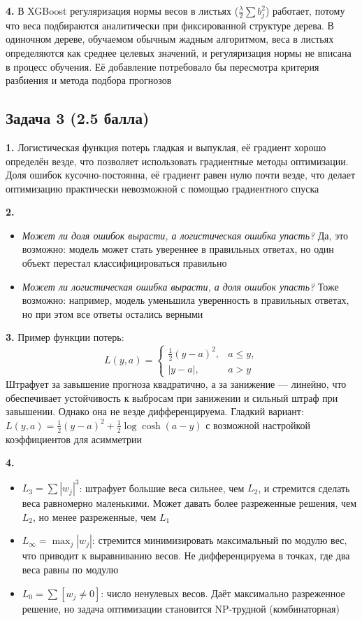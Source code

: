 \documentclass[a4paper,12pt]{article}
\begin{document}
\bigskip

\textbf{4.} В XGBoost регуляризация нормы весов в листьях (\(\frac{\lambda}{2}\sum b_j^2\)) работает, потому что веса подбираются аналитически при фиксированной структуре дерева.
В одиночном дереве, обучаемом обычным жадным алгоритмом, веса в листьях определяются как среднее целевых значений, и регуляризация нормы не вписана в процесс обучения.
Её добавление потребовало бы пересмотра критерия разбиения и метода подбора прогнозов

\newpage

\subsection*{Задача 3 (2.5 балла)}

\textbf{1.} Логистическая функция потерь гладкая и выпуклая, её градиент хорошо определён везде, что позволяет использовать градиентные методы оптимизации.
Доля ошибок кусочно-постоянна, её градиент равен нулю почти везде, что делает оптимизацию практически невозможной с помощью градиентного спуска

\bigskip

\textbf{2.}
\begin{itemize}
  \item \textit{Может ли доля ошибок вырасти, а логистическая ошибка упасть?}
        Да, это возможно: модель может стать увереннее в правильных ответах, но один объект перестал классифицироваться правильно
  \item \textit{Может ли логистическая ошибка вырасти, а доля ошибок упасть?}
        Тоже возможно: например, модель уменьшила уверенность в правильных ответах, но при этом все ответы остались верными
\end{itemize}

\bigskip

\textbf{3.} Пример функции потерь:
\[
L(y,a) = 
\begin{cases}
\frac12 (y-a)^2, & a \le y,\\
|y-a|, & a > y
\end{cases}
\]
Штрафует за завышение прогноза квадратично, а за занижение — линейно, что обеспечивает устойчивость к выбросам при занижении и сильный штраф при завышении.
Однако она не везде дифференцируема.
Гладкий вариант: \(L(y,a) = \frac12 (y-a)^2 + \frac12 \log\cosh(a-y)\) с возможной настройкой коэффициентов для асимметрии

\bigskip

\textbf{4.}
\begin{itemize}
  \item \(L_3 = \sum |w_j|^3\): штрафует большие веса сильнее, чем \(L_2\), и стремится сделать веса равномерно маленькими. Может давать более разреженные решения, чем \(L_2\), но менее разреженные, чем \(L_1\)
  \item \(L_\infty = \max_j |w_j|\): стремится минимизировать максимальный по модулю вес, что приводит к выравниванию весов. Не дифференцируема в точках, где два веса равны по модулю
  \item \(L_0 = \sum [w_j \neq 0]\): число ненулевых весов. Даёт максимально разреженное решение, но задача оптимизации становится NP-трудной (комбинаторная)
\end{itemize}
\end{document}
